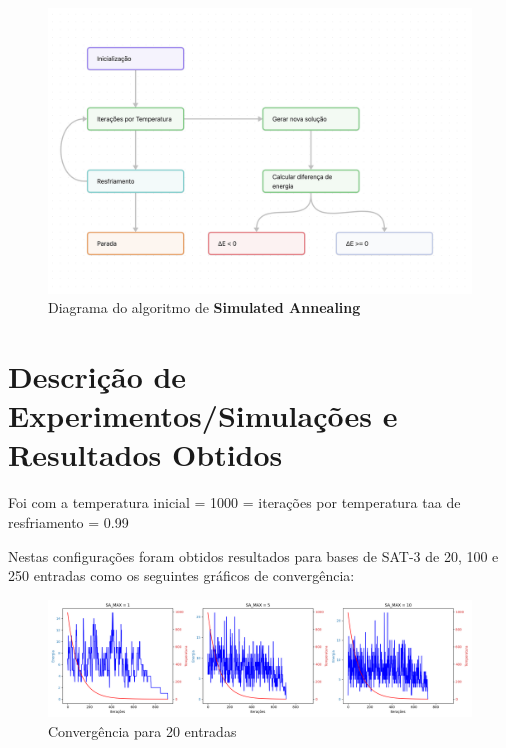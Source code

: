 \documentclass[12pt]{article}
\begin{document}
\begin{figure}[H]
    \centering
    \includegraphics[width=1\textwidth]{imgs/final_diagram.png}
    \caption{Diagrama do algoritmo de \textbf{Simulated Annealing}}
    \label{fig:metodologia}
\end{figure}


\section{Descrição de Experimentos/Simulações e Resultados Obtidos}
\label{sec:descicao_de_experimentos_/_simulacoes_e_resultados_obtidos}


Foi com a temperatura inicial = 1000 = iterações por temperatura taa de resfriamento = 0.99 


Nestas configurações foram obtidos resultados para bases de SAT-3 de 20, 100 e 250 entradas como os seguintes gráficos de convergência:%

\begin{figure}[H]
  \centering
  \includegraphics[width=.9\textwidth]{imgs/melhores_sa_20.png}
  \caption{Convergência para 20 entradas}
  \label{fig:convergencia20}
  \end{figure}
\end{document}
